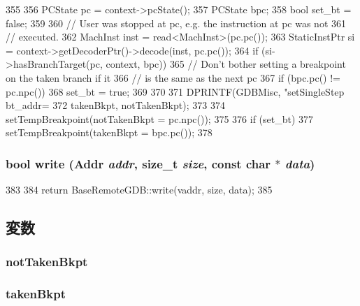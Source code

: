 \begin{DoxyCode}
355 {
356     PCState pc = context->pcState();
357     PCState bpc;
358     bool set_bt = false;
359 
360     // User was stopped at pc, e.g. the instruction at pc was not
361     // executed.
362     MachInst inst = read<MachInst>(pc.pc());
363     StaticInstPtr si = context->getDecoderPtr()->decode(inst, pc.pc());
364     if (si->hasBranchTarget(pc, context, bpc)) {
365         // Don't bother setting a breakpoint on the taken branch if it
366         // is the same as the next pc
367         if (bpc.pc() != pc.npc())
368             set_bt = true;
369     }
370 
371     DPRINTF(GDBMisc, "setSingleStep bt_addr=%
372             takenBkpt, notTakenBkpt);
373 
374     setTempBreakpoint(notTakenBkpt = pc.npc());
375 
376     if (set_bt)
377         setTempBreakpoint(takenBkpt = bpc.pc());
378 }
\end{DoxyCode}
\hypertarget{classArmISA_1_1RemoteGDB_afbada55bb9d0e9c8c26bb48cb5890111}{
\subsubsection[{write}]{\setlength{\rightskip}{0pt plus 5cm}bool write ({\bf Addr} {\em addr}, \/  size\_\-t {\em size}, \/  const char $\ast$ {\em data})}}
\label{classArmISA_1_1RemoteGDB_afbada55bb9d0e9c8c26bb48cb5890111}



\begin{DoxyCode}
383 {
384     return BaseRemoteGDB::write(vaddr, size, data);
385 }
\end{DoxyCode}


\subsection{変数}
\hypertarget{classArmISA_1_1RemoteGDB_ae1a0a563a724aaffa8ae5b4095957aa4}{
\subsubsection[{notTakenBkpt}]{ {\bf notTakenBkpt}}}
\label{classArmISA_1_1RemoteGDB_ae1a0a563a724aaffa8ae5b4095957aa4}
\hypertarget{classArmISA_1_1RemoteGDB_abfdbe67e311a613bbbe39b730279f3e1}{
\subsubsection[{takenBkpt}]{ {\bf takenBkpt}}}
\label{classArmISA_1_1RemoteGDB_abfdbe67e311a613bbbe39b730279f3e1}


